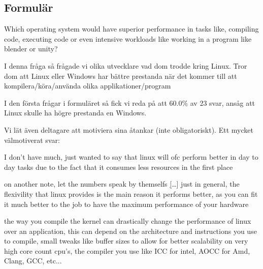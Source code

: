 \documentclass[12pt, a4paper]{report}
\begin{document}
    \subsection{Formulär}   \label{form}

\large {Which operating system would have superior performance in tasks like, compiling code, executing code or even intensive workloads like working in a program  like blender or unity?}
 
   \vspace{.5cm}
 
   \normalsize I denna fråga så frågade vi olika utvecklare vad dom trodde kring Linux. Tror dom att Linux eller Windows har bättre prestanda när det kommer till att kompilera/köra/använda olika applikationer/program
 
 
   \vspace{1cm}
 
 
   \cite{form}


   I den första frågar i formuläret så fick vi reda på att 60.0\% av 23 svar, ansåg att Linux skulle ha högre prestanda en Windows.

    \vspace{.5cm}
    Vi lät även deltagare att motiviera sina åtankar (inte obligatoriskt). Ett mycket välmotiverat svar: \begin{displayquote}I don't have much, just wanted to say that linux will ofc perform better in day to day tasks due to the fact that it consumes less resources in the first place

    on another note, let the numbers speak by themselfs \hyperlink{https://www.phoronix.com/scan.php?page=article&item=win10-debian101-intel} [\dots] just in general, the flexivility that linux provides is the main reason it performs better, as you can fit it much better to the job to have the maximum performance of your hardware

    the way you compile the kernel can drastically change the performance of linux over an application, this can depend on the architecture and instructions you use to compile, small tweaks like buffer sizes to allow for better scalability on very high core count cpu's, the compiler you use like ICC for intel, AOCC for Amd, Clang, GCC, etc...
    \end{displayquote}
\end{document}
